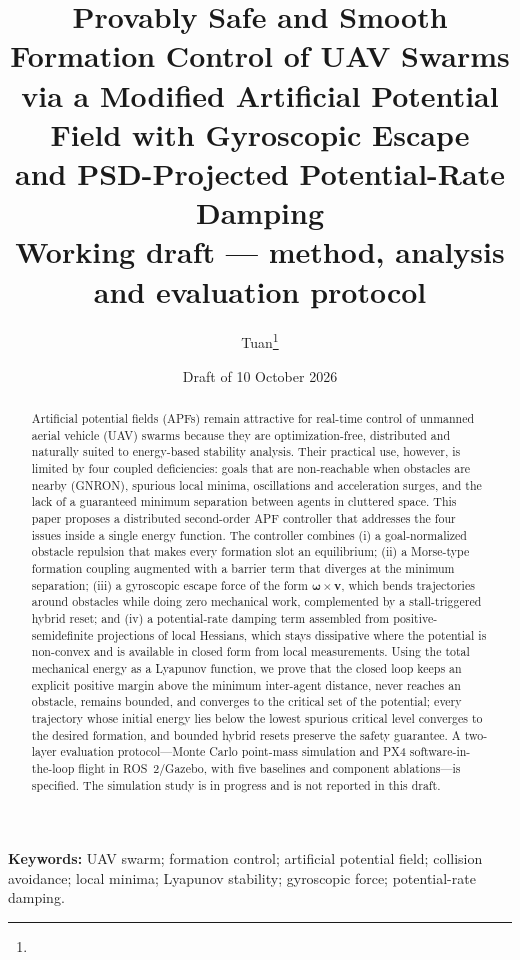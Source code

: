 \documentclass[11pt]{article}
\title{\textbf{Provably Safe and Smooth Formation Control of UAV Swarms\\
via a Modified Artificial Potential Field with Gyroscopic Escape\\
and PSD-Projected Potential-Rate Damping}\\[0.4em]
\large Working draft --- method, analysis and evaluation protocol}
\author{Tuan\thanks{\todo{full name, affiliation, e-mail; co-authors and supervisor}}}
\date{Draft of 10 October 2026}
\theoremstyle{definition}
\theoremstyle{remark}
\newcommand{\bv}{\mathbf{v}}
\newcommand{\bomega}{\bm{\omega}}
\begin{document}
\maketitle

\begin{abstract}
Artificial potential fields (APFs) remain attractive for real-time control of
unmanned aerial vehicle (UAV) swarms because they are optimization-free,
distributed and naturally suited to energy-based stability analysis. Their
practical use, however, is limited by four coupled deficiencies: goals that are
non-reachable when obstacles are nearby (GNRON), spurious local minima,
oscillations and acceleration surges, and the lack of a guaranteed minimum
separation between agents in cluttered space. This paper proposes a distributed
second-order APF controller that addresses the four issues inside a single
energy function. The controller combines (i) a goal-normalized obstacle
repulsion that makes every formation slot an equilibrium; (ii) a Morse-type
formation coupling augmented with a barrier term that diverges at the minimum
separation; (iii) a gyroscopic escape force of the form $\bomega\times\bv$,
which bends trajectories around obstacles while doing zero mechanical work,
complemented by a stall-triggered hybrid reset; and (iv) a potential-rate
damping term assembled from positive-semidefinite projections of local Hessians,
which stays dissipative where the potential is non-convex and is available in
closed form from local measurements. Using the total mechanical energy as a
Lyapunov function, we prove that the closed loop keeps an explicit positive
margin above the minimum inter-agent distance, never reaches an obstacle,
remains bounded, and converges to the critical set of the potential; every
trajectory whose initial energy lies below the lowest spurious critical level
converges to the desired formation, and bounded hybrid resets preserve the
safety guarantee. A two-layer evaluation protocol---Monte Carlo point-mass
simulation and PX4 software-in-the-loop flight in ROS~2/Gazebo, with five
baselines and component ablations---is specified. The simulation study is in
progress and is not reported in this draft.
\end{abstract}

\noindent\textbf{Keywords:} UAV swarm; formation control; artificial potential
field; collision avoidance; local minima; Lyapunov stability; gyroscopic force;
potential-rate damping.
\end{document}
